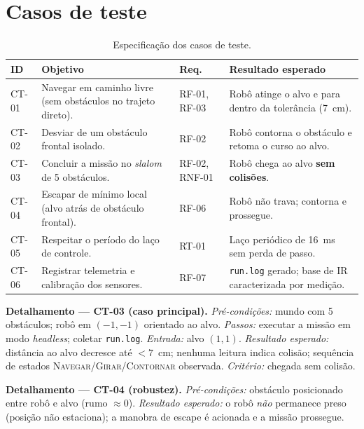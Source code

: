 \section{Casos de teste}
\begin{table}[H]\centering
\caption{Especificação dos casos de teste.}
\renewcommand{\arraystretch}{1.25}
\begin{tabularx}{\textwidth}{@{}l X l X@{}}
\toprule
\textbf{ID} & \textbf{Objetivo} & \textbf{Req.} & \textbf{Resultado esperado} \\
\midrule
CT-01 & Navegar em caminho livre (sem obstáculos no trajeto direto). & RF-01, RF-03 & Robô atinge o alvo e para dentro da tolerância (7~cm). \\
CT-02 & Desviar de um obstáculo frontal isolado. & RF-02 & Robô contorna o obstáculo e retoma o curso ao alvo. \\
CT-03 & Concluir a missão no \emph{slalom} de 5 obstáculos. & RF-02, RNF-01 & Robô chega ao alvo \textbf{sem colisões}. \\
CT-04 & Escapar de mínimo local (alvo atrás de obstáculo frontal). & RF-06 & Robô não trava; contorna e prossegue. \\
CT-05 & Respeitar o período do laço de controle. & RT-01 & Laço periódico de 16~ms sem perda de passo. \\
CT-06 & Registrar telemetria e calibração dos sensores. & RF-07 & \texttt{run.log} gerado; base de IR caracterizada por medição. \\
\bottomrule
\end{tabularx}
\end{table}

\noindent\textbf{Detalhamento --- CT-03 (caso principal).}
\emph{Pré-condições:} mundo com 5 obstáculos; robô em $(-1,-1)$ orientado ao alvo. \emph{Passos:} executar a missão em modo \emph{headless}; coletar \texttt{run.log}. \emph{Entrada:} alvo $(1,1)$. \emph{Resultado esperado:} distância ao alvo decresce até $<7$~cm; nenhuma leitura indica colisão; sequência de estados \textsc{Navegar}/\textsc{Girar}/\textsc{Contornar} observada. \emph{Critério:} chegada sem colisão.

\noindent\textbf{Detalhamento --- CT-04 (robustez).}
\emph{Pré-condições:} obstáculo posicionado entre robô e alvo (rumo $\approx 0$). \emph{Resultado esperado:} o robô \emph{não} permanece preso (posição não estaciona); a manobra de escape é acionada e a missão prossegue.

